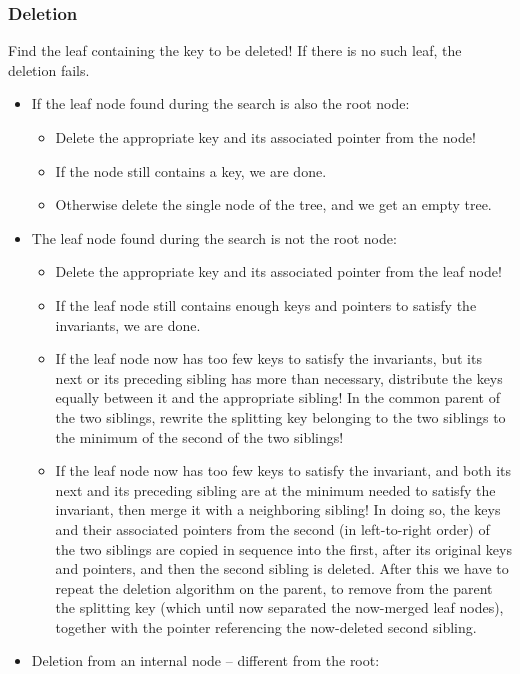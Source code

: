 \documentclass[margin=0px]{article}
\begin{document}
\subsubsection{Deletion}
Find the leaf containing the key to be deleted! If there is no such leaf, the deletion fails.
\begin{itemize}
    \item If the leaf node found during the search is also the root node:
    \begin{itemize}
        \item Delete the appropriate key and its associated pointer from the node!
        \item If the node still contains a key, we are done.
        \item Otherwise delete the single node of the tree, and we get an empty tree.
    \end{itemize}
    \item  The leaf node found during the search is not the root node:
    \begin{itemize}
        \item Delete the appropriate key and its associated pointer from the leaf node!
        \item If the leaf node still contains enough keys and pointers to satisfy the invariants, we are done.
        \item If the leaf node now has too few keys to satisfy the invariants, but its next or its preceding sibling has more than necessary, distribute the keys equally between it and the appropriate sibling! In the common parent of the two siblings, rewrite the splitting key belonging to the two siblings to the minimum of the second of the two siblings!
        \item If the leaf node now has too few keys to satisfy the invariant, and both its next and its preceding sibling are at the minimum needed to satisfy the invariant, then merge it with a neighboring sibling! In doing so, the keys and their associated pointers from the second (in left-to-right order) of the two siblings are copied in sequence into the first, after its original keys and pointers, and then the second sibling is deleted. After this we have to repeat the deletion algorithm on the parent, to remove from the parent the splitting key (which until now separated the now-merged leaf nodes), together with the pointer referencing the now-deleted second sibling.
    \end{itemize}
    \item Deletion from an internal node -- different from the root:

\end{itemize}
\end{document}

